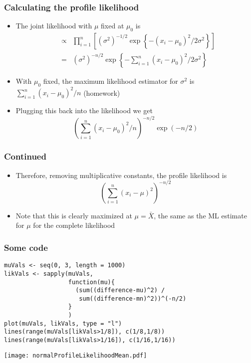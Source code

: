 \documentclass[aspectratio=169]{beamer}
\begin{document}
\begin{frame}\frametitle{Calculating the profile likelihood}
\begin{itemize}
\item The joint likelihood with $\mu$ fixed at $\mu_0$ is
  \begin{eqnarray*}
& \propto &\prod_{i=1}^n \left[(\sigma^2)^{-1/2}\exp\left\{-(x_i - \mu_0)^2/2\sigma^2 \right\} \right]\\
& = &  (\sigma^2)^{-n/2}\exp\left\{-\sum_{i=1}^n(x_i - \mu_0)^2/2\sigma^2 \right\}
  \end{eqnarray*}
\item With $\mu_0$ fixed, the maximum likelihood estimator for $\sigma^2$ is
  $\sum_{i=1}^n(x_i - \mu_0)^2 / n$ (homework)
\item Plugging this back into the likelihood we get
$$
\left(\sum_{i=1}^n(x_i - \mu_0)^2 / n \right)^{-n/2}\exp(-n/2)
$$
\end{itemize}
\end{frame}

\begin{frame}\frametitle{Continued}
\begin{itemize}
\item Therefore, removing multiplicative constants, the profile likelihood is 
  $$
  \left(\sum_{i=1}^n(x_i - \mu)^2 \right)^{-n/2}
  $$
\item Note that this is clearly maximized at $\mu=\bar X$, the same as the ML
  estimate for $\mu$ for the complete likelihood
\end{itemize}
\end{frame}

\begin{frame}[fragile]\frametitle{Some code}
\begin{verbatim}
muVals <- seq(0, 3, length = 1000)
likVals <- sapply(muVals,
                  function(mu){
                    (sum((difference-mu)^2) /
                     sum((difference-mn)^2))^(-n/2) 
                  }
                  )
plot(muVals, likVals, type = "l")
lines(range(muVals[likVals>1/8]), c(1/8,1/8))
lines(range(muVals[likVals>1/16]), c(1/16,1/16))
\end{verbatim}
\end{frame}

\begin{frame}
\texttt{[image: normalProfileLikelihoodMean.pdf]}
\end{frame}
\end{document}
